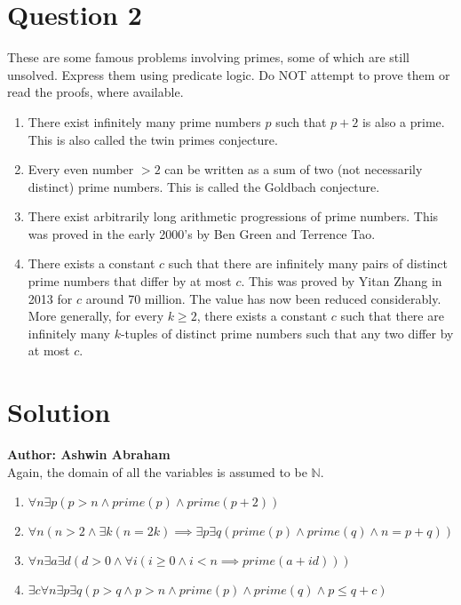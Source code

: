 \documentclass[12pt]{report}
\begin{document}
\section*{Question 2}
These are some famous problems involving primes, some of which are still unsolved. Express them using predicate logic. Do NOT attempt to prove them or read the proofs, where available.
\begin{enumerate}
  \item There exist infinitely many prime numbers $p$ such that $p + 2$ is also a prime. This is also called the twin primes conjecture.
  \item Every even number $ > 2$  can be written as a sum of two (not necessarily distinct) prime numbers. This is called the Goldbach conjecture.
  \item There exist arbitrarily long arithmetic progressions of prime numbers. This was proved in the early 2000's by Ben Green and Terrence Tao.
  \item There exists a constant $c$ such that there are infinitely many pairs of distinct prime numbers that differ by at most $c$. This was proved by Yitan Zhang in 2013 for $c$ around 70 million. The value has now been
  reduced considerably. More generally, for every $k \geq 2$, there exists a constant $c$ such that there are infinitely many $k$-tuples of distinct prime numbers such that any two differ by at most $c$.
\end{enumerate}
\section*{Solution}
\textbf{Author: Ashwin Abraham}\\
Again, the domain of all the variables is assumed to be $\mathbb{N}$.
\begin{enumerate}
  \item $\forall n \exists p (p > n \land prime(p) \land prime(p + 2))$
  \item $\forall n (n > 2 \land \exists k (n = 2k) \implies \exists p \exists q (prime(p) \land prime(q) \land n = p + q))$
  \item $\forall n \exists a \exists d (d > 0 \land \forall i (i \geq 0 \land i < n \implies prime(a + id)))$
  \item $\exists c \forall n \exists p \exists q (p > q \land p > n \land prime(p) \land prime(q) \land p \leq q + c)$
\end{enumerate}
\end{document}
